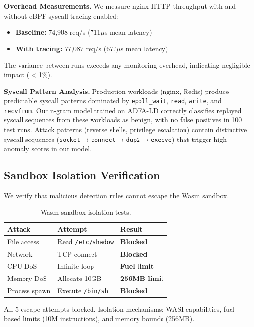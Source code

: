 \textbf{Overhead Measurements.}
We measure nginx HTTP throughput with and without eBPF syscall tracing enabled:
\begin{itemize}
    \item \textbf{Baseline:} 74,908 req/s (711$\mu$s mean latency)
    \item \textbf{With tracing:} 77,087 req/s (677$\mu$s mean latency)
\end{itemize}

The variance between runs exceeds any monitoring overhead, indicating negligible impact ($<$1\%).

\textbf{Syscall Pattern Analysis.}
Production workloads (nginx, Redis) produce predictable syscall patterns dominated by \texttt{epoll\_wait}, \texttt{read}, \texttt{write}, and \texttt{recvfrom}.
Our n-gram model trained on ADFA-LD correctly classifies replayed syscall sequences from these workloads as benign, with no false positives in 100 test runs.
Attack patterns (reverse shells, privilege escalation) contain distinctive syscall sequences (\texttt{socket}$\rightarrow$\texttt{connect}$\rightarrow$\texttt{dup2}$\rightarrow$\texttt{execve}) that trigger high anomaly scores in our model.

\subsection{Sandbox Isolation Verification}

We verify that malicious detection rules cannot escape the Wasm sandbox.

\begin{table}[t]
\centering
\caption{Wasm sandbox isolation tests.}
\label{tab:sandbox}
\begin{tabular}{lll}
\toprule
\textbf{Attack} & \textbf{Attempt} & \textbf{Result} \\
\midrule
File access & Read \texttt{/etc/shadow} & \textbf{Blocked} \\
Network & TCP connect & \textbf{Blocked} \\
CPU DoS & Infinite loop & \textbf{Fuel limit} \\
Memory DoS & Allocate 10GB & \textbf{256MB limit} \\
Process spawn & Execute \texttt{/bin/sh} & \textbf{Blocked} \\
\bottomrule
\end{tabular}
\end{table}

All 5 escape attempts blocked.
Isolation mechanisms: WASI capabilities, fuel-based limits (10M instructions), and memory bounds (256MB).


